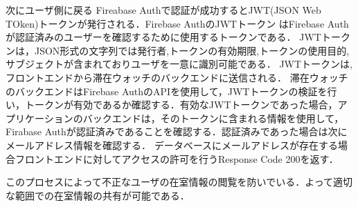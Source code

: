 次にユーザ側に戻る
Fireabase Authで認証が成功するとJWT(JSON Web TOken)トークンが発行される．Firebase AuthのJWTトークン はFirebase Authが認証済みのユーザーを確認するために使用するトークンである．
JWTトークンは，JSON形式の文字列では発行者,トークンの有効期限,トークンの使用目的,サブジェクトが含まれておりユーザを一意に識別可能である．
JWTトークンは,フロントエンドから滞在ウォッチのバックエンドに送信される．
滞在ウォッチのバックエンドはFirebase AuthのAPIを使用して，JWTトークンの検証を行い，トークンが有効であるか確認する．有効なJWTトークンであった場合，アプリケーションのバックエンドは，そのトークンに含まれる情報を使用して，Firabase Authが認証済みであることを確認する．認証済みであった場合は次にメールアドレス情報を確認する．
データベースにメールアドレスが存在する場合フロントエンドに対してアクセスの許可を行うResponse Code 200を返す．

このプロセスによって不正なユーザの在室情報の閲覧を防いでいる．よって適切な範囲での在室情報の共有が可能である．






